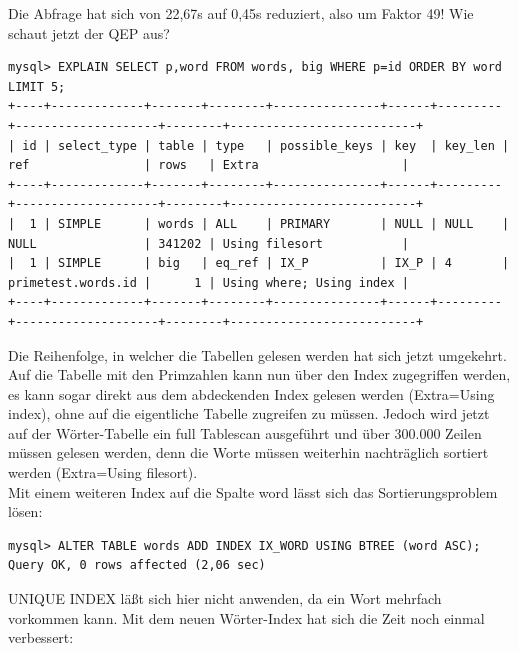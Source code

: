 Die Abfrage hat sich von 22,67s auf 0,45s reduziert, also um Faktor 49!
Wie schaut jetzt der QEP aus?
\begin{lstlisting}[basicstyle=\ttfamily\tiny]
mysql> EXPLAIN SELECT p,word FROM words, big WHERE p=id ORDER BY word LIMIT 5;
+----+-------------+-------+--------+---------------+------+---------+--------------------+--------+--------------------------+
| id | select_type | table | type   | possible_keys | key  | key_len | ref                | rows   | Extra                    |
+----+-------------+-------+--------+---------------+------+---------+--------------------+--------+--------------------------+
|  1 | SIMPLE      | words | ALL    | PRIMARY       | NULL | NULL    | NULL               | 341202 | Using filesort           |
|  1 | SIMPLE      | big   | eq_ref | IX_P          | IX_P | 4       | primetest.words.id |      1 | Using where; Using index |
+----+-------------+-------+--------+---------------+------+---------+--------------------+--------+--------------------------+
\end{lstlisting}
Die Reihenfolge, in welcher die Tabellen gelesen werden hat sich jetzt umgekehrt.
Auf die Tabelle mit den Primzahlen kann nun über den Index zugegriffen werden, es kann sogar direkt aus dem abdeckenden Index gelesen werden (Extra=Using index), ohne auf die eigentliche Tabelle zugreifen zu müssen. Jedoch wird jetzt auf der Wörter-Tabelle ein full Tablescan ausgeführt und über 300.000 Zeilen müssen gelesen werden, denn die Worte müssen weiterhin nachträglich sortiert werden (Extra=Using filesort).\\
Mit einem weiteren Index auf die Spalte word lässt sich das Sortierungsproblem lösen:
\begin{lstlisting}
mysql> ALTER TABLE words ADD INDEX IX_WORD USING BTREE (word ASC);
Query OK, 0 rows affected (2,06 sec)
\end{lstlisting}
UNIQUE INDEX läßt sich hier nicht anwenden, da ein Wort mehrfach vorkommen kann.
Mit dem neuen Wörter-Index hat sich die Zeit noch einmal verbessert:

